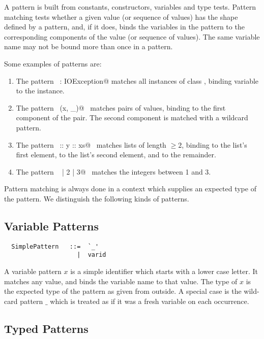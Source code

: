 A pattern is built from constants, constructors, variables and type
tests. Pattern matching tests whether a given value (or sequence of values)
has the shape defined by a pattern, and, if it does, binds the
variables in the pattern to the corresponding components of the value
(or sequence of values).  The same variable name may not be bound more
than once in a pattern.

\example Some examples of patterns are:
\begin{enumerate}
\item
The pattern ~\lstinline@ex: IOException@ matches all instances of class
\lstinline@IOException@, binding variable \verb@ex@ to the instance.
\item
The pattern ~\lstinline@Pair(x, _)@~ matches pairs of values, binding \lstinline@x@ to
the first component of the pair. The second component is matched
with a wildcard pattern.
\item
The pattern ~\lstinline@x :: y :: xs@~ matches lists of length $\geq 2$,
binding \lstinline@x@ to the list's first element, \lstinline@y@ to the list's
second element, and \lstinline@xs@ to the remainder.
\item
The pattern ~ | 2 | 3@~ matches the integers between 1 and 3.
\end{enumerate}

Pattern matching is always done in a context which supplies an
expected type of the pattern. We distinguish the following kinds of
patterns.

\subsection{Variable Patterns}

\syntax\begin{lstlisting}
  SimplePattern   ::=  `_'
                    |  varid
\end{lstlisting}

A variable pattern $x$ is a simple identifier which starts with a
lower case letter.  It matches any value, and binds the variable name
to that value.  The type of $x$ is the expected type of the pattern as
given from outside.  A special case is the wild-card pattern $\_$
which is treated as if it was a fresh variable on each occurrence.

\subsection{Typed Patterns}

